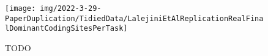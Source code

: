 \begin{figure}
    \centering
    \texttt{[image: img/2022-3-29-PaperDuplication/TidiedData/LalejiniEtAlReplicationRealFinalDominantCodingSitesPerTask]}
    \caption{TODO} \label{fig:LalejiniEtAlReplicationRealFinalDominantCodingSitesPerTask}
\end{figure}
